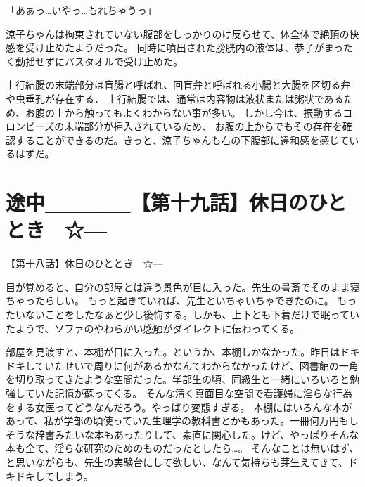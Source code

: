 「あぁっ…いやっ…もれちゃうっ」

涼子ちゃんは拘束されていない腹部をしっかりのけ反らせて、体全体で絶頂の快感を受け止めたようだった。
同時に噴出された膀胱内の液体は、恭子がまったく動揺せずにバスタオルで受け止めた。




上行結腸の末端部分は盲腸と呼ばれ、回盲弁と呼ばれる小腸と大腸を区切る弁や虫垂孔が存在する．
上行結腸では、通常は内容物は液状または粥状であるため、お腹の上から触ってもよくわからない事が多い。
しかし今は、振動するコロンビーズの末端部分が挿入されているため、
お腹の上からでもその存在を確認することができるのだ。きっと、涼子ちゃんも右の下腹部に違和感を感じているはずだ。

\section{途中_____【第十九話】休日のひととき　☆---}
【第十八話】休日のひととき　☆---

目が覚めると、自分の部屋とは違う景色が目に入った。先生の書斎でそのまま寝ちゃったらしい。
もっと起きていれば、先生といちゃいちゃできたのに。
もったいないことをしたなぁと少し後悔する。しかも、上下とも下着だけで眠っていたようで、ソファのやわらかい感触がダイレクトに伝わってくる。

部屋を見渡すと、本棚が目に入った。というか、本棚しかなかった。昨日はドキドキしていたせいで周りに何があるかなんてわからなかったけど、図書館の一角を切り取ってきたような空間だった。学部生の頃、同級生と一緒にいろいろと勉強していた記憶が蘇ってくる。
そんな清く真面目な空間で看護婦に淫らな行為をする女医ってどうなんだろう。やっぱり変態すぎる。
本棚にはいろんな本があって、私が学部の頃使っていた生理学の教科書とかもあった。一冊何万円もしそうな辞書みたいな本もあったりして、素直に関心した。けど、やっぱりそんな本も全て、淫らな研究のためのものだったとしたら…。
そんなことは無いはず、と思いながらも、先生の実験台にして欲しい、なんて気持ちも芽生えてきて、ドキドキしてしまう。

